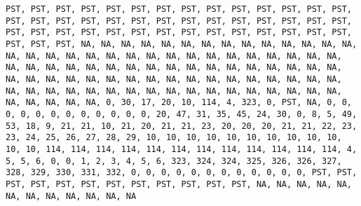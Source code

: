 \documentclass[]{article}
\begin{document}
\begin{verbatim}
PST, PST, PST, PST, PST, PST, PST, PST, PST, PST, PST, PST, PST, PST, PST, PST, PST, PST, PST, PST, PST, PST, PST, PST, PST, PST, PST, PST, PST, PST, PST, PST, PST, PST, PST, PST, PST, PST, PST, PST, PST, PST, PST, PST, PST, NA, NA, NA, NA, NA, NA, NA, NA, NA, NA, NA, NA, NA, NA, NA, NA, NA, NA, NA, NA, NA, NA, NA, NA, NA, NA, NA, NA, NA, NA, NA, NA, NA, NA, NA, NA, NA, NA, NA, NA, NA, NA, NA, NA, NA, NA, NA, NA, NA, NA, NA, NA, NA, NA, NA, NA, NA, NA, NA, NA, NA, NA, NA, NA, NA, NA, NA, NA, NA, NA, NA, NA, NA, NA, NA, NA, NA, NA, NA, NA, NA, NA, NA, NA, NA, NA, NA, 0, 30, 17, 20, 10, 114, 4, 323, 0, PST, NA, 0, 0, 0, 0, 0, 0, 0, 0, 0, 0, 0, 0, 20, 47, 31, 35, 45, 24, 30, 0, 8, 5, 49, 53, 18, 9, 21, 21, 10, 21, 20, 21, 21, 23, 20, 20, 20, 21, 21, 22, 23, 23, 24, 25, 26, 27, 28, 29, 10, 10, 10, 10, 10, 10, 10, 10, 10, 10, 10, 10, 114, 114, 114, 114, 114, 114, 114, 114, 114, 114, 114, 114, 4, 5, 5, 6, 0, 0, 1, 2, 3, 4, 5, 6, 323, 324, 324, 325, 326, 326, 327, 328, 329, 330, 331, 332, 0, 0, 0, 0, 0, 0, 0, 0, 0, 0, 0, 0, PST, PST, PST, PST, PST, PST, PST, PST, PST, PST, PST, PST, NA, NA, NA, NA, NA, NA, NA, NA, NA, NA, NA, NA

\end{verbatim}
\end{document}
